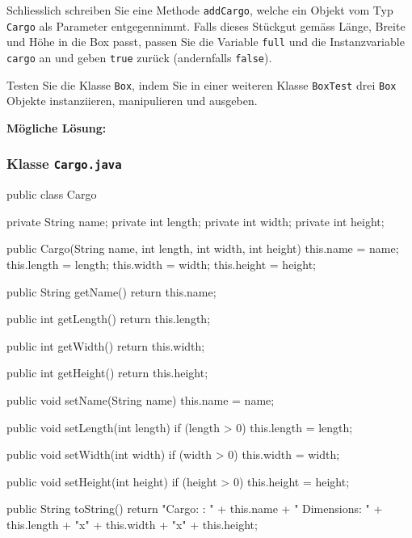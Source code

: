 \documentclass[a4paper,10pt, dvipsnames]{report}
\begin{document}
Schliesslich schreiben Sie eine Methode \texttt{addCargo}, welche ein Objekt vom Typ \texttt{Cargo} als Parameter entgegennimmt. Falls dieses Stückgut gemäss Länge, Breite und Höhe in die Box passt, passen Sie die Variable \texttt{full} und die Instanzvariable \texttt{cargo} an und geben \texttt{true} zurück (andernfalls \texttt{false}).

Testen Sie die Klasse \texttt{Box}, indem Sie in einer weiteren Klasse \texttt{BoxTest} drei \texttt{Box} Objekte instanziieren, manipulieren und ausgeben.

\textbf{Mögliche Lösung:}

\subsubsection{Klasse \texttt{Cargo.java}}

\begin{javacodebox}
public class Cargo {
    
    private String name;
    private int length;
    private int width;
    private int height;

    public Cargo(String name, int length, int width, int height) {
        this.name = name;
        this.length = length;
        this.width = width;
        this.height = height;
    }

    public String getName() {
        return this.name;
    }

    public int getLength() {
        return this.length;
    }

    public int getWidth() {
        return this.width;
    }

    public int getHeight() {
        return this.height;
    }

    public void setName(String name) {
        this.name = name;
    }

    public void setLength(int length) {
        if (length > 0) {
            this.length = length;
        }
    }

    public void setWidth(int width) {
        if (width > 0) {
            this.width = width;
        }
    }

    public void setHeight(int height) {
        if (height > 0) {
            this.height = height;
        }
    }

    public String toString() {
        return "Cargo: \tName: " + this.name + " Dimensions: " + this.length + "x" + this.width + "x" + this.height;
    }
}
\end{javacodebox}
\end{document}
